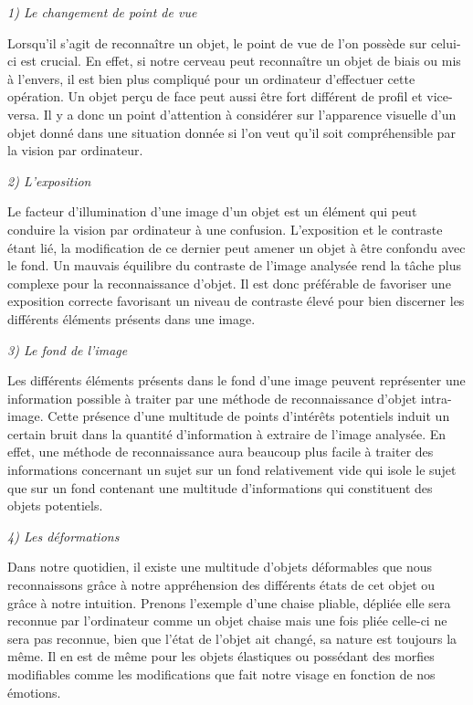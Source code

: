 \documentclass[a4paper,12pt]{article} %
\begin{document}
\textit{1)	Le changement de point de vue} \newline

Lorsqu’il s’agit de reconnaître un objet, le point de vue de l’on possède sur celui-ci est crucial. En effet, si notre cerveau peut reconnaître un objet de biais ou mis à l’envers, il est bien plus compliqué pour un ordinateur d’effectuer cette opération. Un objet perçu de face peut aussi être fort différent de profil et vice-versa. Il y a donc un point d’attention à considérer sur l’apparence visuelle d’un objet donné dans une situation donnée si l'on veut qu'il soit compréhensible par la vision par ordinateur.\newline

\textit{2)	L’exposition}\newline

Le facteur d’illumination d’une image d’un objet est un élément qui peut conduire la vision par ordinateur à une confusion. L’exposition et le contraste étant lié, la modification de ce dernier peut amener un objet à être confondu avec le fond. Un mauvais équilibre du contraste de l'image analysée rend la tâche plus complexe pour la reconnaissance d'objet. Il est donc préférable de favoriser une exposition correcte favorisant un niveau de contraste élevé pour bien discerner les différents éléments présents dans une image. \newline

\textit{3)	Le fond de l’image }\newline

Les différents éléments présents dans le fond d’une image peuvent représenter une information possible à traiter par une méthode de reconnaissance d’objet intra-image. Cette présence d'une multitude de points d'intérêts potentiels induit un certain bruit dans la quantité d'information à extraire de l'image analysée. En effet, une méthode de reconnaissance aura beaucoup plus facile à traiter des informations concernant un sujet sur un fond relativement vide qui isole le sujet que sur un fond contenant une multitude d’informations qui constituent des objets potentiels.\newline

\textit{4)	Les déformations} \newline

Dans notre quotidien, il existe une multitude d’objets déformables que nous reconnaissons grâce à notre appréhension des différents états de cet objet ou grâce à notre intuition. Prenons l’exemple d’une chaise pliable, dépliée elle sera reconnue par l’ordinateur comme un objet chaise mais une fois pliée celle-ci ne sera pas reconnue, bien que l’état de l’objet ait changé, sa nature est toujours la même. Il en est de même pour les objets élastiques ou possédant des morfies modifiables comme les modifications que fait notre visage en fonction de nos émotions.\newline
\end{document}
